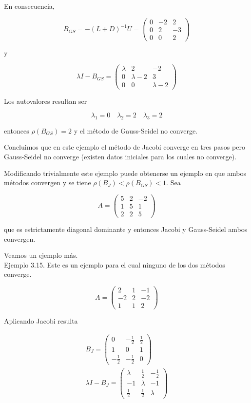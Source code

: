 \documentclass[10pt]{book}
\begin{document}
En consecuencia,

$$
B_{G S}=-(L+D)^{-1} U=\left(\begin{array}{ccc}
0 & -2 & 2 \\
0 & 2 & -3 \\
0 & 0 & 2
\end{array}\right)
$$

y

$$
\lambda I-B_{G S}=\left(\begin{array}{ccc}
\lambda & 2 & -2 \\
0 & \lambda-2 & 3 \\
0 & 0 & \lambda-2
\end{array}\right)
$$

Los autovalores resultan ser

$$
\lambda_{1}=0 \quad \lambda_{2}=2 \quad \lambda_{3}=2
$$

entonces $\rho\left(B_{G S}\right)=2$ y el método de Gauss-Seidel no converge.

Concluimos que en este ejemplo el método de Jacobi converge en tres pasos pero Gauss-Seidel no converge (existen datos iniciales para los cuales no converge).

Modificando trivialmente este ejemplo puede obtenerse un ejemplo en que ambos métodos convergen y se tiene $\rho\left(B_{J}\right)<\rho\left(B_{G S}\right)<1$. Sea

$$
A=\left(\begin{array}{ccc}
5 & 2 & -2 \\
1 & 5 & 1 \\
2 & 2 & 5
\end{array}\right)
$$

que es estrictamente diagonal dominante y entonces Jacobi y Gauss-Seidel ambos convergen.

Veamos un ejemplo más.\\
Ejemplo 3.15. Este es un ejemplo para el cual ninguno de los dos métodos converge.

$$
A=\left(\begin{array}{ccc}
2 & 1 & -1 \\
-2 & 2 & -2 \\
1 & 1 & 2
\end{array}\right)
$$

Aplicando Jacobi resulta

$$
\begin{gathered}
B_{J}=\left(\begin{array}{ccc}
0 & -\frac{1}{2} & \frac{1}{2} \\
1 & 0 & 1 \\
-\frac{1}{2} & -\frac{1}{2} & 0
\end{array}\right) \\
\lambda I-B_{J}=\left(\begin{array}{ccc}
\lambda & \frac{1}{2} & -\frac{1}{2} \\
-1 & \lambda & -1 \\
\frac{1}{2} & \frac{1}{2} & \lambda
\end{array}\right)
\end{gathered}
$$
\end{document}
